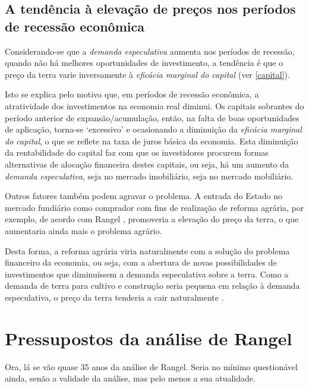 \documentclass[
	12pt,				%
	oneside,			%
	a4paper,			%
	chapter=TITLE,		%
	section=TITLE,		%
	english,			%
	brazil				%
	]{abntex2}
\begin{document}
\hypertarget{a-tenduxeancia-uxe0-elevauxe7uxe3o-de-preuxe7os-nos-peruxedodos-de-recessuxe3o-econuxf4mica}{%
\subsection{A tendência à elevação de preços nos períodos de recessão econômica}\label{a-tenduxeancia-uxe0-elevauxe7uxe3o-de-preuxe7os-nos-peruxedodos-de-recessuxe3o-econuxf4mica}}

Considerando-se que a \emph{demanda especulativa} aumenta nos períodos de recessão,
quando não há melhores oportunidades de investimento, a tendência é que o preço
da terra varie inversamente à \emph{eficácia marginal do capital} (ver \ref{capital}).

Isto se explica pelo motivo que, em períodos de recessão econômica, a
atratividade dos investimentos na economia real diminui. Os capitais sobrantes
do período anterior de expansão/acumulação, então, na falta de boas
oportunidades de aplicação, torna-se `excessivo' e ocasionando a diminuição da
\emph{eficácia marginal do capital}, o que se reflete na taxa de juros básica da
economia. Esta diminuição da rentabilidade do capital faz com que os
investidores procurem formas alternativas de alocação financeira destes
capitais, ou seja, há um aumento da \emph{demanda especulativa}, seja no mercado
imobiliário, seja no mercado mobiliário.

Outros fatores também podem agravar o problema. A entrada do Estado no mercado
fundiário como comprador com fins de realização de reforma agrária, por exemplo,
de acordo com Rangel \autocite*[128]{rangel1985}, promoveria a elevação do preço da
terra, o que aumentaria ainda mais o problema agrário.

Desta forma, a reforma agrária viria naturalmente com a solução do problema
financeiro da economia, ou seja, com a abertura de novas possibilidades de
investimentos que diminuíssem a demanda especulativa sobre a terra. Como a
demanda de terra para cultivo e construção seria pequena em relação à demanda
especulativa, o preço da terra tenderia a cair naturalmente \autocite[139]{rangel1986b}.

\hypertarget{pressupostos-da-anuxe1lise-de-rangel}{%
\section{Pressupostos da análise de Rangel}\label{pressupostos-da-anuxe1lise-de-rangel}}

Ora, lá se vão quase 35 anos da análise de Rangel. Seria no mínimo questionável
ainda, senão a validade da análise, mas pelo menos a sua atualidade.
\end{document}
